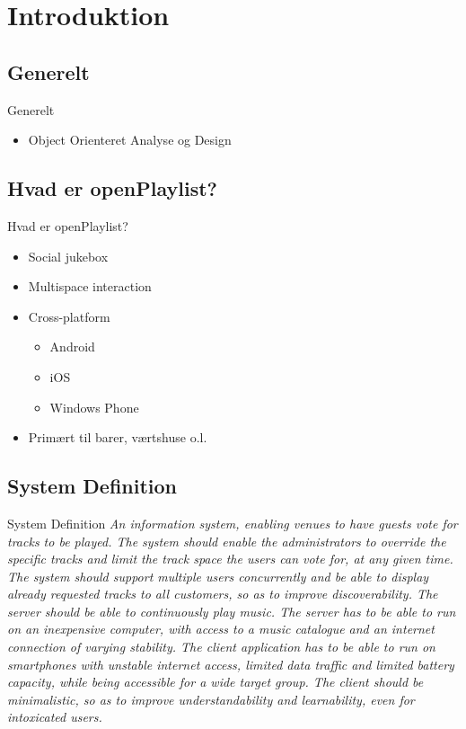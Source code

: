 \section{Introduktion}

\subsection{Generelt}
\begin{frame}{Generelt}
	\begin{itemize}
		\item Object Orienteret Analyse og Design
	\end{itemize}
\end{frame}

\subsection{Hvad er openPlaylist?}
\begin{frame}{Hvad er openPlaylist?}
	\begin{itemize}
		\item Social jukebox
		\item Multispace interaction
		\item Cross-platform
		\begin{itemize}
			\item Android
			\item iOS
			\item Windows Phone
		\end{itemize}
		\item Primært til barer, værtshuse o.l.
	\end{itemize}
\end{frame}

\subsection{System Definition}
\begin{frame}{System Definition}
		\textit{An information system, enabling venues to have guests vote for tracks to be played. The system should enable the administrators to override the specific tracks and limit the track space the users can vote for, at any given time. The system should support multiple users concurrently and be able to display already requested tracks to all customers, so as to improve discoverability. The server should be able to continuously play music. The server has to be able to run on an inexpensive computer, with access to a music catalogue and an internet connection of varying stability. The client application has to be able to run on smartphones with unstable internet access, limited data traffic and limited battery capacity, while being accessible for a wide target group. The client should be minimalistic, so as to improve understandability and learnability, even for intoxicated users.}
\end{frame}

